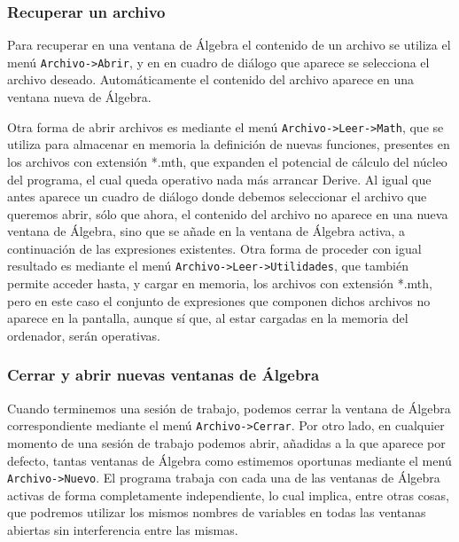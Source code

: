 \subsubsection*{Recuperar un archivo}
Para recuperar en una ventana de Álgebra el contenido de un archivo
se utiliza el menú \texttt{Archivo->Abrir}, y en en cuadro de
diálogo que aparece se selecciona el archivo deseado.
Automáticamente el contenido del archivo aparece en una ventana
nueva de Álgebra.

Otra forma de abrir archivos es mediante el menú
\texttt{Archivo->Leer->Math}, que se utiliza para almacenar en
memoria la definición de nuevas funciones, presentes en los archivos
con extensión *.mth, que expanden el potencial de cálculo del núcleo
del programa, el cual queda operativo nada más arrancar Derive. Al
igual que antes aparece un cuadro de diálogo donde debemos
seleccionar el archivo que queremos abrir, sólo que ahora, el
contenido del archivo no aparece en una nueva ventana de Álgebra,
sino que se añade en la ventana de Álgebra activa, a continuación de
las expresiones existentes. Otra forma de proceder con igual
resultado es mediante el menú \texttt{Archivo->Leer->Utilidades},
que también permite acceder hasta, y cargar en memoria, los archivos
con extensión *.mth, pero en este caso el conjunto de expresiones
que componen dichos archivos no aparece en la pantalla, aunque sí
que, al estar cargadas en la memoria del ordenador, serán
operativas.

\subsubsection*{Cerrar y abrir nuevas ventanas de Álgebra}
Cuando terminemos una sesión de trabajo, podemos cerrar la ventana
de Álgebra correspondiente mediante el menú
\texttt{Archivo->Cerrar}. Por otro lado, en cualquier momento de una
sesión de trabajo podemos abrir, añadidas a la que aparece por
defecto, tantas ventanas de Álgebra como estimemos oportunas
mediante el menú \texttt{Archivo->Nuevo}. El programa trabaja con
cada una de las ventanas de Álgebra activas de forma completamente
independiente, lo cual implica, entre otras cosas, que podremos
utilizar los mismos nombres de variables en todas las ventanas
abiertas sin interferencia entre las mismas.

